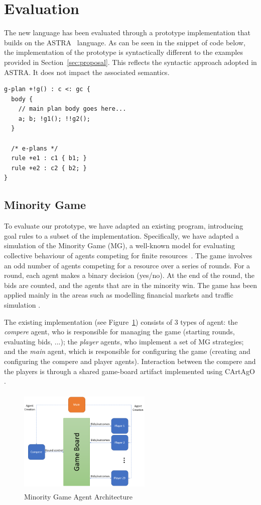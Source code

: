 \section{Evaluation}
\label{sec:evaluation}
The new language has been evaluated through a prototype implementation that builds on 
the ASTRA~\cite{DBLP:conf/prima/CollierRL15} language.  As can be seen in the snippet 
of code below, the implementation of the {\aser} prototype is syntactically different 
to the examples provided in Section~\ref{sec:proposal}. This reflects the syntactic 
approach adopted in ASTRA. It does not impact the associated semantics.

{\small
\begin{verbatim}
g-plan +!g() : c <: gc { 
  body {
    // main plan body goes here...
    a; b; !g1(); !!g2();
  }

  /* e-plans */
  rule +e1 : c1 { b1; }
  rule +e2 : c2 { b2; }
}
\end{verbatim}}

\subsection{Minority Game}
\label{minority}
To evaluate our prototype, we have adapted an existing program, introducing {\aser} goal
rules to a subset of the implementation. Specifically, we have adapted a simulation of
the Minority Game (MG), a well-known model for evaluating collective behaviour of agents competing 
for finite resources~\cite{moro2004minority}. The game involves an odd number of
agents competing for a resource over a series of rounds. For a round, each agent makes a binary
decision (yes/no). At the end of the round, the bids are counted, and the agents that are in the
minority win. The game has been applied mainly in the areas such as modelling financial markets 
\cite{challet2013minority} and traffic simulation \cite{chmura2004minority}.

The existing implementation (see Figure~\ref{fig:mgagents}) consists of 3 types of agent: the 
\emph{compere} agent, who is responsible for managing the game (starting rounds, evaluating bids,
 ...); the \emph{player} agents, who implement a set of MG strategies; and the \emph{main} agent, 
 which is responsible for configuring the game (creating and configuring the compere and player 
 agents). Interaction between the compere and the players is through a shared game-board artifact 
 implemented using CArtAgO \cite{...}.

\begin{figure}[!tbh]
\centering
\includegraphics[height=2in, width=2.5in]{mg.png}
\caption{Minority Game Agent Architecture}
\label{fig:mgagents}
\end{figure}

